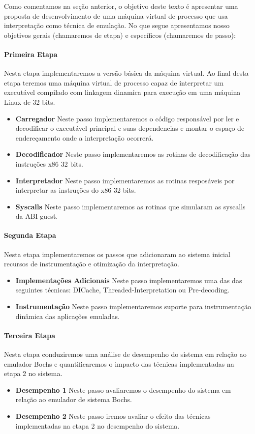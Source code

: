 \documentclass[11pt,twoside]{article}
\begin{document}
Como comentamos na seção anterior, o objetivo deste texto é apresentar
uma proposta de desenvolvimento de uma máquina virtual de processo que
usa interpretação como técnica de emulação. No que segue apresentamos
nosso objetivos gerais (chamaremos de etapa) e específicos (chamaremos
de passo):

\paragraph{Primeira Etapa} Nesta etapa implementaremos a versão básica da 
máquina virtual. Ao final desta etapa teremos uma máquina virtual de
processo capaz de interpretar um executável compilado com linkagem
dinamica para execução em uma máquina Linux de 32 bits.
	\begin{itemize}
		\item \textbf{Carregador} Neste passo implementaremos o código responsável
		por ler e decodificar o executável principal e suas dependencias
		e montar o espaço de endereçamento onde a interpretação ocorrerá.
		\item \textbf{Decodificador} Neste passo implementaremos as rotinas de 
		decodificação das instruções x86 32 bits.
		\item \textbf{Interpretador} Neste passo implementaremos as rotinas 
		resposáveis por interpretar as instruções do x86 32 bits.
		\item \textbf{Syscalls} Neste passo implementaremos as rotinas que simularam
		as syscalls da ABI guest.
	\end{itemize}

\paragraph{Segunda Etapa} Nesta etapa implementaremos os passos que adicionaram
ao sistema inicial recursos de instrumentação e otimização da interpretação.
	\begin{itemize}
		\item \textbf{Implementações Adicionais} Neste passo implementaremos uma das
		das seguintes técnicas: DICache, Threaded-Interpretation ou Pre-decoding.
		\item \textbf{Instrumentação} Neste passo implementaremos suporte para 
		instrumentação dinâmica das aplicações emuladas.
	\end{itemize}
 
\paragraph{Terceira Etapa} Nesta etapa conduziremos uma análise de desempenho do sistema
em relação ao emulador Bochs e quantificaremos o impacto das técnicas implementadas
na etapa 2 no sistema.
	\begin{itemize}
		\item \textbf{Desempenho 1} Neste passo avaliaremos o desempenho do sistema
		em relação ao emulador de sistema Bochs.
		\item \textbf{Desempenho 2} Neste passo iremos avaliar o efeito das técnicas 
		implementadas na etapa 2 no desempenho do sistema.
	\end{itemize}
\end{document}
